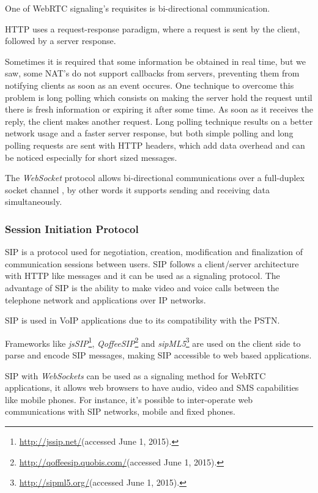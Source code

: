 \documentclass[conference,compsoc,a4paper]{IEEEtran}
\begin{document}
  One of \gls{WebRTC} signaling's requisites is bi-directional communication.

  \gls{HTTP} uses a request-response paradigm, where a request is sent by the client, followed by a server response. 

  Sometimes it is required that some information be obtained in real time, but we saw, some \gls{NAT}'s do not support callbacks from servers, preventing them from notifying clients as soon as an event occures.
One technique to overcome this problem is long polling which consists on making the server hold the request until there is fresh information or expiring it after some time.
As soon as it receives the reply, the client makes another request. Long polling technique results on a better network usage and a faster server response, but both simple polling and long polling requests are sent with \gls{HTTP} headers, which add data overhead and can be noticed especially for short sized messages.

The \emph{WebSocket} protocol allows bi-directional communications over a full-duplex socket channel \cite{rfc6455}, by other words it supports sending and receiving data simultaneously.

 
  \subsubsection{Session Initiation Protocol}

  \gls{SIP} \cite{rfc3261} is a protocol used for negotiation, creation, modification and finalization of communication sessions between users. \gls{SIP} follows a client/server architecture with \gls{HTTP} like messages and it can be used as a signaling protocol. The advantage of \gls{SIP} is the ability to make video and voice calls between the telephone network and applications over \gls{IP} networks.

  \gls{SIP} is used in \gls{VoIP} applications due to its compatibility with the \gls{PSTN}.

  Frameworks like \emph{jsSIP}\footnote{\url{http://jssip.net/}(accessed June 1, 2015).}, \emph{QoffeeSIP}\footnote{\url{http://qoffeesip.quobis.com/}(accessed June 1, 2015).} and \emph{sipML5}\footnote{\url{http://sipml5.org/}(accessed June 1, 2015).} are used on the client side to parse and encode \gls{SIP} messages, making \gls{SIP} accessible to web based applications. 

  \gls{SIP} with \emph{WebSockets} can be used as a signaling method for \gls{WebRTC} applications, it allows web browsers to have audio, video and \gls{SMS} capabilities like mobile phones. For instance, it's possible to inter-operate web communications with \gls{SIP} networks, mobile and fixed phones.
\end{document}
